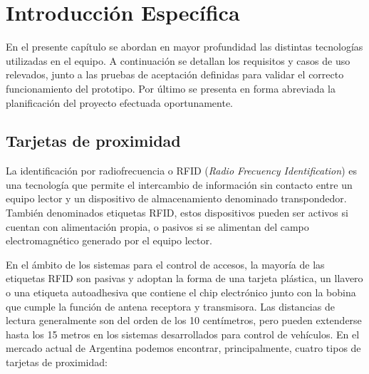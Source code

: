 
\chapter{Introducción Específica}
\label{Chapter2}

En el presente capítulo se abordan en mayor profundidad las distintas tecnologías utilizadas en el equipo. A continuación se detallan los requisitos y casos de uso relevados, junto a las pruebas de aceptación definidas para validar el correcto funcionamiento del prototipo. Por último se presenta en forma abreviada la planificación del proyecto efectuada oportunamente.

\section{Tarjetas de proximidad}
\label{sec:tarjetas}

La identificación por radiofrecuencia o RFID (\emph{Radio Frecuency Identification}) es una tecnología que permite el intercambio de información sin contacto entre un equipo lector y un dispositivo de almacenamiento denominado transpondedor\cite{noauthor_rfid_2020}. También denominados etiquetas RFID, estos dispositivos pueden ser activos si cuentan con alimentación propia, o pasivos si se alimentan del campo electromagnético generado por el equipo lector. 

En el ámbito de los sistemas para el control de accesos, la mayoría de las etiquetas RFID son pasivas y adoptan la forma de una tarjeta plástica, un llavero o una etiqueta autoadhesiva que contiene el chip electrónico junto con la bobina que cumple la función de antena receptora y transmisora. Las distancias de lectura generalmente son del orden de los 10 centímetros, pero pueden extenderse hasta los 15 metros en los sistemas desarrollados para control de vehículos. En el mercado actual de Argentina podemos encontrar, principalmente, cuatro tipos de tarjetas de proximidad:

